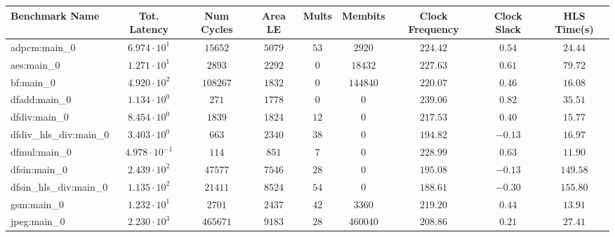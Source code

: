 \begin{tabular}{|l|c|c|c|c|c|c|c|c|}
\hline
Benchmark Name          & Tot. Latency            & Num Cycles & Area LE   & Mults   & Membits    & Clock Frequency & Clock Slack & HLS Time(s) \\
\hline
adpcm:main\_0           & $ 6.974 \cdot 10^{1}  $ & $ 15652  $ & $ 5079  $ & $ 53  $ & $ 2920   $ & $ 224.42      $ & $ 0.54    $ & $ 24.44   $ \\
aes:main\_0             & $ 1.271 \cdot 10^{1}  $ & $ 2893   $ & $ 2292  $ & $ 0   $ & $ 18432  $ & $ 227.63      $ & $ 0.61    $ & $ 79.72   $ \\
bf:main\_0              & $ 4.920 \cdot 10^{2}  $ & $ 108267 $ & $ 1832  $ & $ 0   $ & $ 144840 $ & $ 220.07      $ & $ 0.46    $ & $ 16.08   $ \\
dfadd:main\_0           & $ 1.134 \cdot 10^{0}  $ & $ 271    $ & $ 1778  $ & $ 0   $ & $ 0      $ & $ 239.06      $ & $ 0.82    $ & $ 35.51   $ \\
dfdiv:main\_0           & $ 8.454 \cdot 10^{0}  $ & $ 1839   $ & $ 1824  $ & $ 12  $ & $ 0      $ & $ 217.53      $ & $ 0.40    $ & $ 15.77   $ \\
dfdiv\_hls\_div:main\_0 & $ 3.403 \cdot 10^{0}  $ & $ 663    $ & $ 2340  $ & $ 38  $ & $ 0      $ & $ 194.82      $ & $ -0.13   $ & $ 16.97   $ \\
dfmul:main\_0           & $ 4.978 \cdot 10^{-1} $ & $ 114    $ & $ 851   $ & $ 7   $ & $ 0      $ & $ 228.99      $ & $ 0.63    $ & $ 11.90   $ \\
dfsin:main\_0           & $ 2.439 \cdot 10^{2}  $ & $ 47577  $ & $ 7546  $ & $ 28  $ & $ 0      $ & $ 195.08      $ & $ -0.13   $ & $ 149.58  $ \\
dfsin\_hls\_div:main\_0 & $ 1.135 \cdot 10^{2}  $ & $ 21411  $ & $ 8524  $ & $ 54  $ & $ 0      $ & $ 188.61      $ & $ -0.30   $ & $ 155.80  $ \\
gsm:main\_0             & $ 1.232 \cdot 10^{1}  $ & $ 2701   $ & $ 2437  $ & $ 42  $ & $ 3360   $ & $ 219.20      $ & $ 0.44    $ & $ 13.91   $ \\
jpeg:main\_0            & $ 2.230 \cdot 10^{3}  $ & $ 465671 $ & $ 9183  $ & $ 28  $ & $ 460040 $ & $ 208.86      $ & $ 0.21    $ & $ 27.41   $ \\

\end{tabular}
